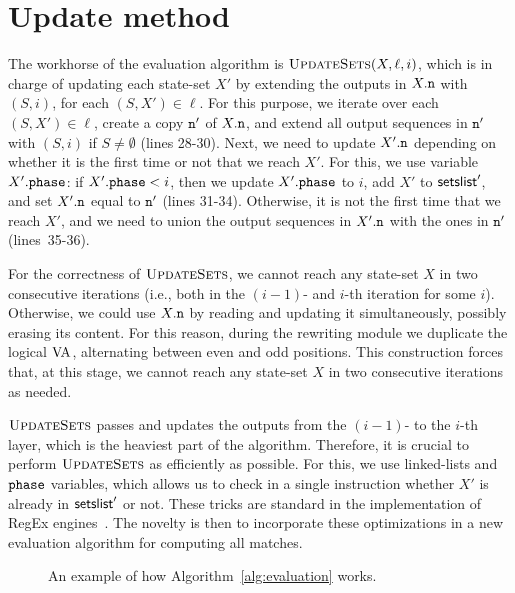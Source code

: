 \section{Update method}
The workhorse of the evaluation algorithm is $\textproc{UpdateSets}(X, \ell,i)$,
which is in charge of updating each state-set $X'$ by extending the outputs in
$X.\mathtt{n}$ with $(S,i)$, for each $(S, X') \in \!\ell$. For this purpose, we
iterate over each $(S, X') \in \ell$, create a copy $\mathtt{n}'$ of $X.\mathtt{n}$, and
extend all output sequences in $\mathtt{n}'$ with $(S,i)$ if $S\neq \emptyset$ (lines
28-30). Next, we need to update $X'.\mathtt{n}$ depending on whether it is the first
time or not that we reach $X'$. For this, we use variable $X'.\texttt{phase}$: if
$X'.\texttt{phase} < i$, then we update $X'.\texttt{phase}$ to $i$, add $X'$ to
$\textsf{setslist}'$, and set $X'.\mathtt{n}$ equal to $\mathtt{n}'$ (lines 31-34). Otherwise,
it is not the first time that we reach $X'$, and we need to union the output
sequences in $X'.\mathtt{n}$ with the ones in $\mathtt{n}'$ (lines~35-36).

For the correctness of $\textproc{UpdateSets}$, we cannot reach any state-set
$X$ in two consecutive iterations (i.e., both in the $(i-1)$- and $i$-th
iteration for some $i$). Otherwise, we could use $X.\mathtt{n}$ by reading and
updating it simultaneously, possibly erasing its content. For this reason,
during the rewriting module we duplicate the logical $\mathrm{VA}$, alternating between
even and odd positions. This construction forces that, at this stage, we cannot
reach any state-set $X$ in two consecutive iterations as needed.


$\textproc{UpdateSets}$ passes and updates the outputs from the $(i-1)$- to the
$i$-th layer, which is the heaviest part of the algorithm. Therefore, it is
crucial to perform $\textproc{UpdateSets}$ as efficiently as possible. For this,
we use linked-lists and $\texttt{phase}$ variables, which allows us to check in a single
instruction whether $X'$ is already in $\textsf{setslist}'$ or not. These tricks are
standard in the implementation of RegEx engines~\citep{cox2007regular}. The
novelty is then to incorporate these optimizations in a new evaluation algorithm
for computing all matches.

\begin{figure}
	\centering
	
	\caption{An example of how Algorithm~\ref{alg:evaluation} works.}
	\label{fig:algo-run}
\end{figure}

